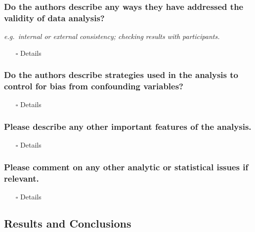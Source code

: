 \documentclass[
  doc, a4paper]{apa7}
\providecommand{\tightlist}{%
  \setlength{\itemsep}{0pt}\setlength{\parskip}{0pt}}
\begin{document}
\subsubsection{Do the authors describe any ways they have addressed the validity of data analysis?}\label{do-the-authors-describe-any-ways-they-have-addressed-the-validity-of-data-analysis}

\emph{e.g.~internal or external consistency; checking results with participants.}

\begin{itemize}
\tightlist
\item[$\square$]
  Details
\end{itemize}

\subsubsection{Do the authors describe strategies used in the analysis to control for bias from confounding variables?}\label{do-the-authors-describe-strategies-used-in-the-analysis-to-control-for-bias-from-confounding-variables}

\begin{itemize}
\tightlist
\item[$\square$]
  Details
\end{itemize}

\subsubsection{Please describe any other important features of the analysis.}\label{please-describe-any-other-important-features-of-the-analysis.}

\begin{itemize}
\tightlist
\item[$\square$]
  Details
\end{itemize}

\subsubsection{Please comment on any other analytic or statistical issues if relevant.}\label{please-comment-on-any-other-analytic-or-statistical-issues-if-relevant.}

\begin{itemize}
\tightlist
\item[$\square$]
  Details
\end{itemize}

\subsection{Results and Conclusions}\label{results-and-conclusions}
\end{document}

